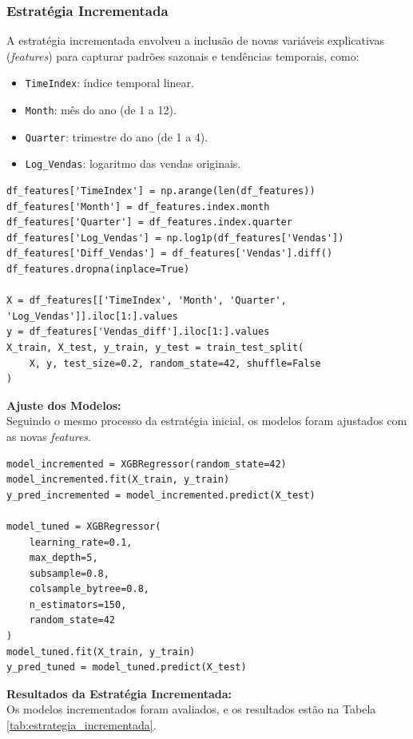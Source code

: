 \documentclass[a4paper, 12pt]{article}
\begin{document}
\subsubsection{Estratégia Incrementada}
A estratégia incrementada envolveu a inclusão de novas variáveis explicativas (\textit{features}) para capturar padrões sazonais e tendências temporais, como:
\begin{itemize}
    \item \texttt{TimeIndex}: índice temporal linear.
    \item \texttt{Month}: mês do ano (de 1 a 12).
    \item \texttt{Quarter}: trimestre do ano (de 1 a 4).
    \item \texttt{Log\_Vendas}: logaritmo das vendas originais.
\end{itemize}

\begin{lstlisting}[style=Python, caption=Preparação dos Dados - Estratégia Incrementada]
df_features['TimeIndex'] = np.arange(len(df_features))
df_features['Month'] = df_features.index.month
df_features['Quarter'] = df_features.index.quarter
df_features['Log_Vendas'] = np.log1p(df_features['Vendas'])
df_features['Diff_Vendas'] = df_features['Vendas'].diff()
df_features.dropna(inplace=True)

X = df_features[['TimeIndex', 'Month', 'Quarter', 'Log_Vendas']].iloc[1:].values
y = df_features['Vendas_diff'].iloc[1:].values
X_train, X_test, y_train, y_test = train_test_split(
    X, y, test_size=0.2, random_state=42, shuffle=False
)
\end{lstlisting}

\textbf{Ajuste dos Modelos:}\\
Seguindo o mesmo processo da estratégia inicial, os modelos foram ajustados com as novas \textit{features}.

\begin{lstlisting}[style=Python, caption=Ajuste de Modelos - Estratégia Incrementada]
model_incremented = XGBRegressor(random_state=42)
model_incremented.fit(X_train, y_train)
y_pred_incremented = model_incremented.predict(X_test)

model_tuned = XGBRegressor(
    learning_rate=0.1,
    max_depth=5,
    subsample=0.8,
    colsample_bytree=0.8,
    n_estimators=150,
    random_state=42
)
model_tuned.fit(X_train, y_train)
y_pred_tuned = model_tuned.predict(X_test)
\end{lstlisting}

\textbf{Resultados da Estratégia Incrementada:}\\
Os modelos incrementados foram avaliados, e os resultados estão na Tabela \ref{tab:estrategia_incrementada}.
\end{document}
